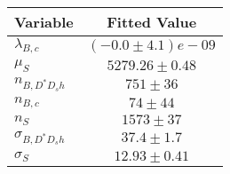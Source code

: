\begin{tabular}[t]{lc}
\hline
Variable &Fitted Value\\
\hline\hline
$\lambda_{B,c}$&$(-0.0\pm4.1)e-09$\\
\hline
$\mu_S$&$5279.26\pm0.48$\\
\hline
$n_{B, D^* D_s h}$&$751\pm36$\\
\hline
$n_{B,c}$&$74\pm44$\\
\hline
$n_S$&$1573\pm37$\\
\hline
$\sigma_{B, D^* D_s h}$&$37.4\pm1.7$\\
\hline
$\sigma_S$&$12.93\pm0.41$\\
\hline
\end{tabular}